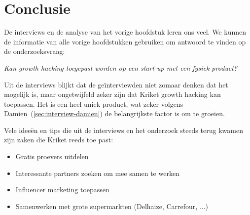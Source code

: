 
\chapter{Conclusie}
\label{ch:conclusie}


De interviews en de analyse van het vorige hoofdstuk leren ons veel. We kunnen de informatie van alle vorige hoofdstukken gebruiken om antwoord te vinden op de onderzoeksvraag:

\emph{Kan growth hacking toegepast worden op een start-up met een fysiek product?}

Uit de interviews blijkt dat de geïnterviewden niet zomaar denken dat het mogelijk is, maar ongetwijfeld zeker zijn dat Kriket growth hacking kan toepassen. Het is een heel uniek product, wat zeker volgens Damien~(\ref{sec:interview-damien}) de belangrijkste factor is om te groeien. 

Vele ideeën en tips die uit de interviews en het onderzoek steeds terug kwamen zijn zaken die Kriket reeds toe past:
\begin{itemize}
	\item Gratis proevers uitdelen
	\item Interessante partners zoeken om mee samen te werken
	\item Influencer marketing toepassen
	\item Samenwerken met grote supermarkten (Delhaize, Carrefour, ...)
\end{itemize}

